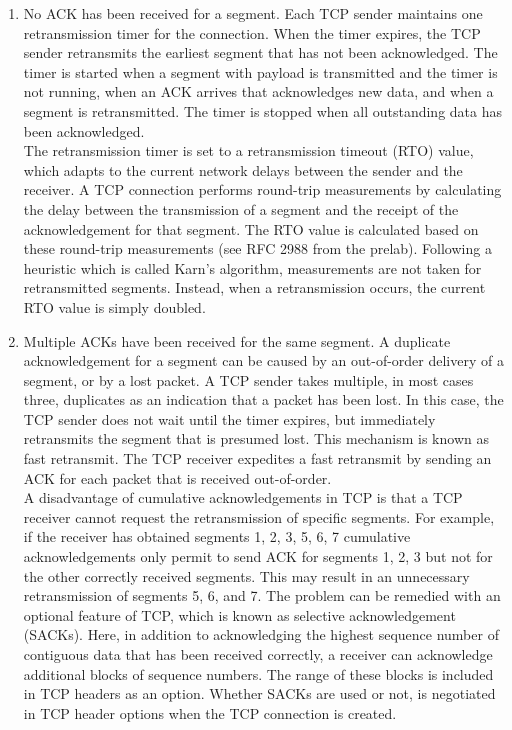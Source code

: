 \begin{enumerate}
	\item No ACK has been received for a segment. Each TCP sender maintains one retransmission timer for the connection. When the timer expires, the TCP sender retransmits the earliest segment that has not been acknowledged. The timer is started when a segment with payload is transmitted and the timer is not running, when an ACK arrives that acknowledges new data, and when a segment is retransmitted. The timer is stopped when all outstanding data has been acknowledged.\\
		The retransmission timer is set to a retransmission timeout (RTO) value, which adapts to the current network delays between the sender and the receiver. A TCP connection performs round-trip measurements by calculating the delay between the transmission of a segment and the receipt of the acknowledgement for that segment. The RTO value is calculated based on these round-trip measurements (see RFC 2988 from the prelab). Following a heuristic which is called Karn’s algorithm, measurements are not taken for retransmitted segments. Instead, when a retransmission occurs, the current RTO value is simply doubled.
	\item Multiple ACKs have been received for the same segment. A duplicate acknowledgement for a segment can be caused by an out-of-order delivery of a segment, or by a lost packet. A TCP sender takes multiple, in most cases three, duplicates as an indication that a packet has been lost. In this case, the TCP sender does not wait until the timer expires, but immediately retransmits the segment that is presumed lost. This mechanism is known as fast retransmit. The TCP receiver expedites a fast retransmit by sending an ACK for each packet that is received out-of-order.\\
		A disadvantage of cumulative acknowledgements in TCP is that a TCP receiver cannot request the retransmission of specific segments. For example, if the receiver has obtained segments 1, 2, 3, 5, 6, 7 cumulative acknowledgements only permit to send ACK for segments 1, 2, 3 but not for the other correctly received segments. This may result in an unnecessary retransmission of segments 5, 6, and 7. The problem can be remedied with an optional feature of TCP, which is known as selective acknowledgement (SACKs). Here, in addition to acknowledging the highest sequence number of contiguous data that has been received correctly, a receiver can acknowledge additional blocks of sequence numbers. The range of these blocks is included in TCP headers as an option. Whether SACKs are used or not, is negotiated in TCP header options when the TCP connection is created.
\end{enumerate}

